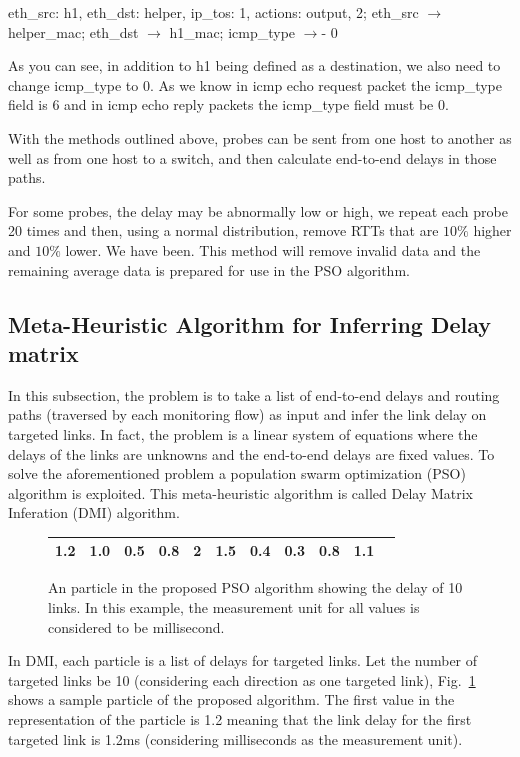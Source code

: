 \documentclass[10pt, journal, letterpaper]{IEEEtran}
\begin{document}
eth_src: h1, eth\_dst: helper, ip_tos: 1, actions: output, 2; eth\_src $\rightarrow$ helper_mac; eth\_dst $\rightarrow$ h1_mac;
icmp\_type $\rightarrow$- 0

As you can see, in addition to h1 being defined as a destination, we also need to change icmp\_type to 0. As we know in icmp echo request packet the icmp\_type field is 6 and in icmp echo reply packets the icmp\_type field must be 0.

With the methods outlined above, probes can be sent from one host to another as well as from one host to a switch, and then calculate end-to-end delays in those paths.

For some probes, the delay may be abnormally low or high, we repeat each probe 20 times and then, using a normal distribution, remove RTTs that are $10\%$ higher and $10\%$ lower. We have been. This method will remove invalid data and the remaining average data is prepared for use in the PSO algorithm.

\subsection{Meta-Heuristic Algorithm for Inferring Delay matrix}\label{subsec:pso}
In this subsection, the problem is to take a list of end-to-end delays and routing paths (traversed by each monitoring flow) as input and infer the link delay on targeted links. In fact, the problem is a linear system of equations where the delays of the links are unknowns and the end-to-end delays are fixed values. To solve the aforementioned problem a population swarm optimization (PSO) algorithm is exploited. This meta-heuristic algorithm is called Delay Matrix Inferation (DMI) algorithm. 
\begin{figure}
	\begin{center}
		\begin{tabular}{|c|c|c|c|c|c|c|c|c|c|c|}\hline
			1.2 & 1.0 & 0.5 & 0.8 & 2 & 1.5 & 0.4 & 0.3 & 0.8 & 1.1\\\hline
		\end{tabular}
		\caption{An particle in the proposed PSO algorithm showing the delay of 10 links. In this example, the measurement unit for all values is considered to be millisecond.}
		\label{fig:particle}
	\end{center}%
\end{figure}
In DMI, each particle is a list of delays for targeted links. Let the number of targeted links be 10 (considering each direction as one targeted link), Fig.~\ref{fig:particle} shows a sample particle of the proposed algorithm. The first value in the representation of the particle is 1.2 meaning that the link delay for the first targeted link is 1.2ms (considering milliseconds as the measurement unit).
\end{document}
